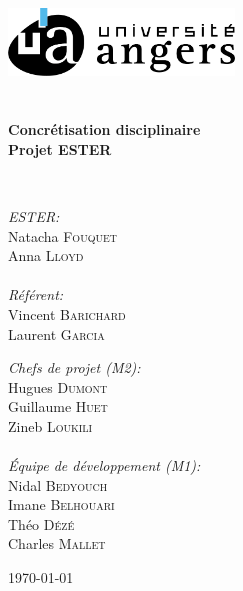 \begin{titlepage}
    \begin{center}
    
    \includegraphics[width=0.45\textwidth]{./img/ua_h_couleur}~\\[1cm]
    
    \textsc{\Large }\\[0.5cm]
    
    \HRule \\[0.4cm]
    
    {\huge \bfseries Concrétisation disciplinaire\\
   Projet ESTER \\[0.4cm] }
    
    \HRule \\[1.5cm]
    
    \begin{minipage}{0.4\textwidth}
    \begin{flushleft} \large
    
     \emph{ESTER:}\\
    Natacha \textsc{Fouquet}\\
    Anna \textsc{Lloyd}\\
    \textsc{\Large }\\[0.3cm]
    \emph{Référent:}\\
    Vincent \textsc{Barichard}\\
    Laurent \textsc{Garcia}
    
    \end{flushleft}
    \end{minipage}
    \begin{minipage}{0.4\textwidth}
    \begin{flushright} \large
    
	\emph{Chefs de projet (M2):}\\
    Hugues \textsc{Dumont}\\
    Guillaume \textsc{Huet}\\
    Zineb \textsc{Loukili}\\
    \textsc{\Large }\\[0.3cm]
    \emph{Équipe de développement (M1):}\\
    Nidal \textsc{Bedyouch}\\
    Imane \textsc{Belhouari}\\
    Théo \textsc{Dézé}\\
    Charles \textsc{Mallet}    
    \end{flushright}
    \end{minipage}
    
    \vfill
    
    {\large \today}
    
    \end{center}
    \end{titlepage}